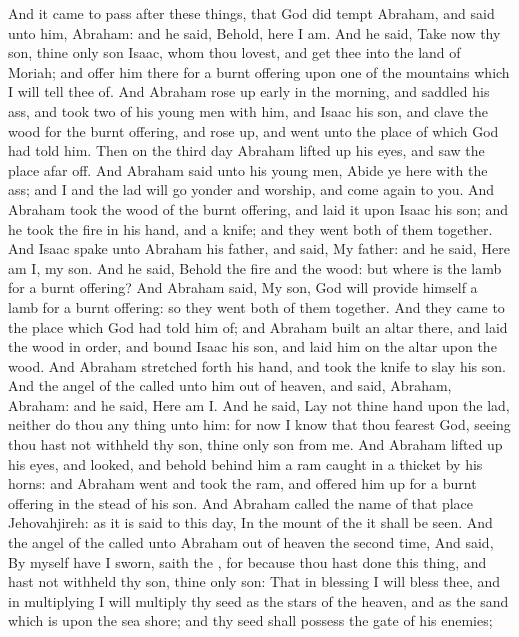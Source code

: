 \begin{biblechapter} %
 And it came to pass after these things, that God did tempt Abraham, and said unto him, Abraham: and he said, Behold, here I am.
\verse And he said, Take now thy son, thine only son Isaac, whom thou lovest, and get thee into the land of Moriah; and offer him there for a burnt offering upon one of the mountains which I will tell thee of.
\verse And Abraham rose up early in the morning, and saddled his ass, and took two of his young men with him, and Isaac his son, and clave the wood for the burnt offering, and rose up, and went unto the place of which God had told him.
\verse Then on the third day Abraham lifted up his eyes, and saw the place afar off.
\verse And Abraham said unto his young men, Abide ye here with the ass; and I and the lad will go yonder and worship, and come again to you.
\verse And Abraham took the wood of the burnt offering, and laid it upon Isaac his son; and he took the fire in his hand, and a knife; and they went both of them together.
\verse And Isaac spake unto Abraham his father, and said, My father: and he said, Here am I, my son. And he said, Behold the fire and the wood: but where is the lamb for a burnt offering?
\verse And Abraham said, My son, God will provide himself a lamb for a burnt offering: so they went both of them together.
\verse And they came to the place which God had told him of; and Abraham built an altar there, and laid the wood in order, and bound Isaac his son, and laid him on the altar upon the wood.
\verse And Abraham stretched forth his hand, and took the knife to slay his son.
\verse And the angel of the \LORD called unto him out of heaven, and said, Abraham, Abraham: and he said, Here am I.
\verse And he said, Lay not thine hand upon the lad, neither do thou any thing unto him: for now I know that thou fearest God, seeing thou hast not withheld thy son, thine only son from me.
\verse And Abraham lifted up his eyes, and looked, and behold behind him a ram caught in a thicket by his horns: and Abraham went and took the ram, and offered him up for a burnt offering in the stead of his son.
\verse And Abraham called the name of that place Jehovahjireh: as it is said to this day, In the mount of the \LORD it shall be seen.
\verse And the angel of the \LORD called unto Abraham out of heaven the second time,
\verse And said, By myself have I sworn, saith the \LORD, for because thou hast done this thing, and hast not withheld thy son, thine only son:
\verse That in blessing I will bless thee, and in multiplying I will multiply thy seed as the stars of the heaven, and as the sand which is upon the sea shore; and thy seed shall possess the gate of his enemies;

\end{biblechapter}
